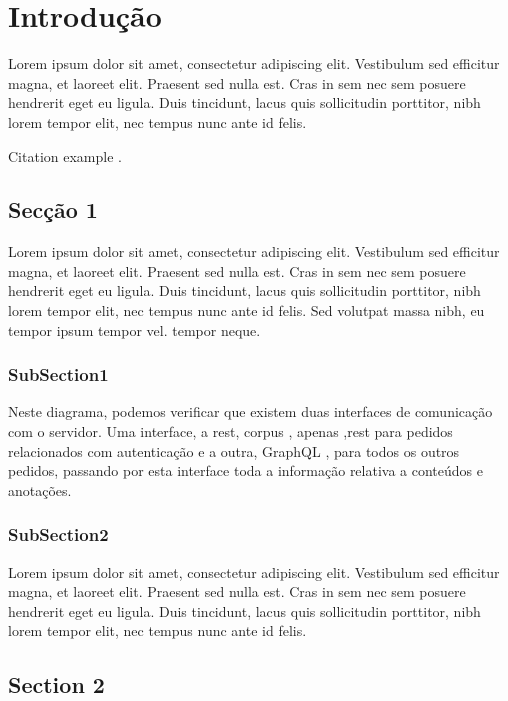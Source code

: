 \chapter{Introdução}

Lorem ipsum dolor sit amet, consectetur adipiscing elit. Vestibulum sed efficitur magna, et laoreet elit. Praesent sed nulla est. Cras in sem nec sem posuere hendrerit eget eu ligula. Duis tincidunt, lacus quis sollicitudin porttitor, nibh lorem tempor elit, nec tempus nunc ante id felis.

Citation example \cite{oppenheimer_why_2003}. 




\section{Secção 1}
\label{subsec:sec1}

Lorem ipsum dolor sit amet, consectetur adipiscing elit. Vestibulum sed efficitur magna, et laoreet elit. Praesent sed nulla est. Cras in sem nec sem posuere hendrerit eget eu ligula. Duis tincidunt, lacus quis sollicitudin porttitor, nibh lorem tempor elit, nec tempus nunc ante id felis. Sed volutpat massa nibh, eu tempor ipsum tempor vel. tempor neque.

\subsection{SubSection1}

Neste diagrama, podemos verificar que existem duas interfaces de comunicação com o servidor. Uma interface, a \gls{rest}, \gls{corpus} , apenas ,\acrshort{rest} para pedidos relacionados com autenticação e a outra, GraphQL , para todos os outros pedidos, passando por esta interface toda a informação relativa a conteúdos e anotações.\\

\subsection{SubSection2}

Lorem ipsum dolor sit amet, consectetur adipiscing elit. Vestibulum sed efficitur magna, et laoreet elit. Praesent sed nulla est. Cras in sem nec sem posuere hendrerit eget eu ligula. Duis tincidunt, lacus quis sollicitudin porttitor, nibh lorem tempor elit, nec tempus nunc ante id felis.

\section{Section 2}
\label{subsec:sec2}

